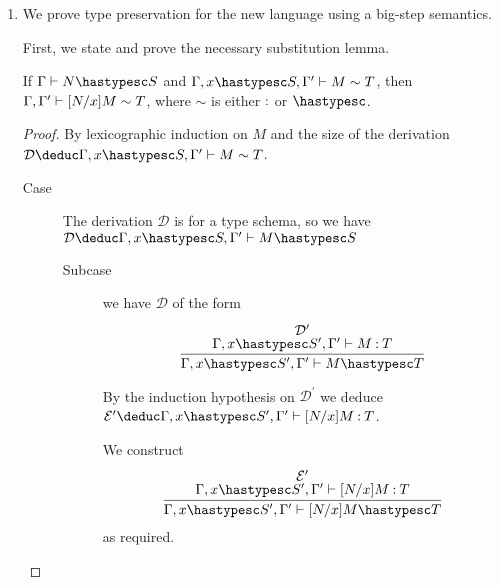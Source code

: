 \documentclass[11pt]{article}
\begin{document}
\begin{enumerate}
  \item
    We prove type preservation for the new language using a big-step semantics.

    First, we state and prove the necessary substitution lemma.
    \begin{lem}[Substitution]
      If $\Gamma \proves N \hastypesc S$ and
      $\Gamma, x \hastypesc S, \Gamma^\prime \proves M \sim T$,
      then $\Gamma, \Gamma^\prime \vdash [N/x]M \sim T$,
      where $\sim$ is either $\mathbin{:}$ or $\hastypesc$.
    \end{lem}

    \begin{proof}
      By lexicographic induction on $M$ and the size of the derivation
      $\mathcal{D} \deduc
      \Gamma, x \hastypesc S, \Gamma^\prime
      \proves M \sim T$.

      \begin{description}
        \item[Case]
          The derivation $\mathcal{D}$ is for a type schema, so we have
          $
          \mathcal{D} \deduc
          \Gamma, x \hastypesc S, \Gamma^\prime \proves M \hastypesc S
          $
          \begin{description}
            \item[Subcase]
              we have $\mathcal{D}$ of the form
              \begin{equation*}
                \infer{
                  \Gamma, x \hastypesc S^\prime, \Gamma^\prime \proves M \hastypesc T
                }{
                  \deduce[\mathcal{D}^\prime]{
                    \Gamma, x \hastypesc S^\prime, \Gamma^\prime \proves M \hastype T
                  }{}
                }
              \end{equation*}

              By the induction hypothesis on $\mathcal{D}^\prime$ we deduce
              $\mathcal{E}^\prime \deduc \Gamma, x \hastypesc S^\prime, \Gamma^\prime \proves [N/x]M \hastype T$.
              
              We construct
              \begin{equation*}
                \infer{
                  \Gamma, x \hastypesc S^\prime, \Gamma^\prime \proves [N/x]M \hastypesc T
                }{
                  \deduce[\mathcal{E}^\prime]{
                    \Gamma, x \hastypesc S^\prime, \Gamma^\prime \proves [N/x]M \hastype T
                  }{}
                }
              \end{equation*}
              as required.


\end{description}
\end{description}
\end{proof}
\end{enumerate}
\end{document}
